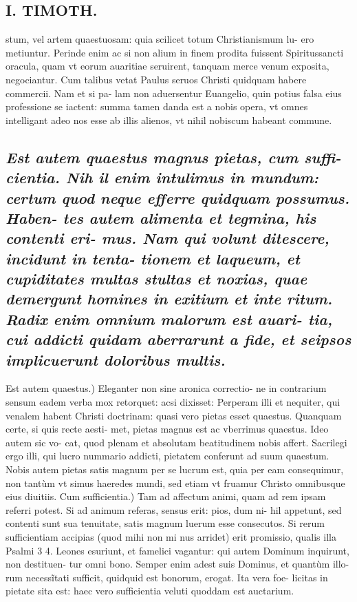 \documentclass{article}
\begin{document}
\begin{pages}
\section*{I. TIMOTH. }
\marginpar{[ p.76 ]}\pstart stum, vel artem quaestuosam: quia scilicet totum Christianismum lu- ero metiuntur. Perinde enim ac si non alium in finem prodita fuissent Spiritussancti oracula, quam vt eorum auaritiae seruirent, tanquam merce venum exposita, negociantur. Cum talibus vetat Paulus seruos Christi quidquam habere commercii. Nam et si pa- lam non aduersentur Euangelio, quin potius falsa eius professione se iactent: summa tamen danda est a nobis opera, vt omnes intelligant adeo nos esse ab illis alienos, vt nihil nobiscum habeant commune.  \pend
{}
{}
\subsection*{\textit{Est autem quaestus magnus pietas, cum suffi- cientia. Nih il enim intulimus in mundum: certum quod neque efferre quidquam possumus. Haben- tes autem alimenta et tegmina, his contenti eri- mus. Nam qui volunt ditescere, incidunt in tenta- tionem et laqueum, et cupiditates multas stultas et noxias, quae demergunt homines in exitium et inte ritum. Radix enim omnium malorum est auari- tia, cui addicti quidam aberrarunt a fide, et seipsos implicuerunt doloribus multis. }}\pstart Est autem quaestus.) Eleganter non sine aronica correctio- ne in contrarium sensum eadem verba mox retorquet: acsi dixisset: Perperam illi et nequiter, qui venalem habent Christi doctrinam: quasi vero pietas esset quaestus. Quanquam certe, si quis recte aesti- met, pietas magnus est ac vberrimus quaestus. Ideo autem sic vo- cat, quod plenam et absolutam beatitudinem nobis affert. Sacrilegi ergo illi, qui lucro nummario addicti, pietatem conferunt ad suum quaestum. Nobis autem pietas satis magnum per se lucrum est, quia per eam consequimur, non tantùm vt simus haeredes mundi, sed etiam vt fruamur Christo omnibusque eius diuitiis.  \pend\pstart Cum sufficientia.) Tam ad affectum animi, quam ad rem ipsam referri potest. Si ad animum referas, sensus erit: pios, dum ni- hil appetunt, sed contenti sunt sua tenuitate, satis magnum luerum esse consecutos. Si rerum sufficientiam accipias (quod mihi non mi nus arridet) erit promissio, qualis illa Psalmi 3 4. Leones esuriunt, et famelici vagantur: qui autem Dominum inquirunt, non destituen- tur omni bono. Semper enim adest suis Dominus, et quantùm illo- rum necessĩtati sufficit, quidquid est bonorum, erogat. Ita vera foe- licitas in pietate sita est: haec vero sufficientia veluti quoddam est auctarium.  \pend

\end{pages}
\end{document}
